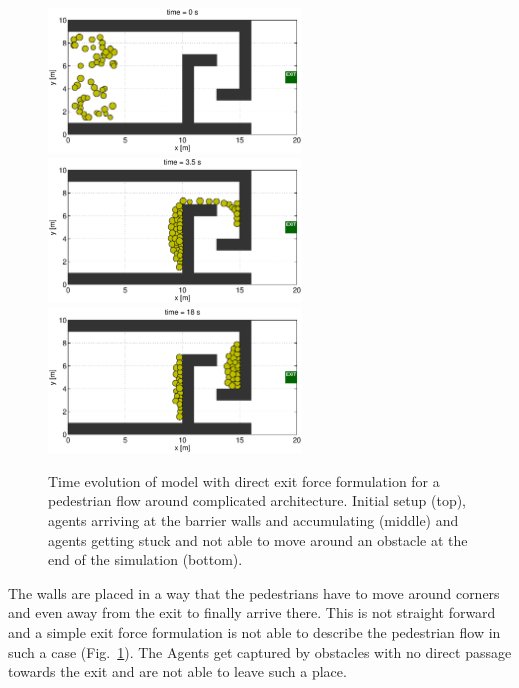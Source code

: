 \documentclass[11pt]{article}
\begin{document}
\begin{figure}
	\begin{center}
	\includegraphics[width=0.6\textwidth]
	{figures/Model2_direct_1b_000000.eps}
	\qquad
	\includegraphics[width=0.6\textwidth]
	{figures/Model2_direct_1b_000350.eps}
	\qquad
	\includegraphics[width=0.6\textwidth]
	{figures/Model2_direct_1b_001800.eps}
	\caption{Time evolution of model with direct exit force formulation for a pedestrian flow around complicated architecture. Initial setup (top), agents arriving at the barrier walls and accumulating  (middle) and agents getting stuck and not able to move around an obstacle at the end of the simulation (bottom).}
	\label{fig:simple3}
	\end{center}
\end{figure}

The walls are placed in a way that the pedestrians have to move around corners and even away from the exit to finally arrive there. This is not straight forward and a simple exit force formulation is not able to describe the pedestrian flow in such a case (Fig.~\ref{fig:simple3}). The Agents get captured by obstacles with no direct passage towards the exit and are not able to leave such a place. 
\end{document}
